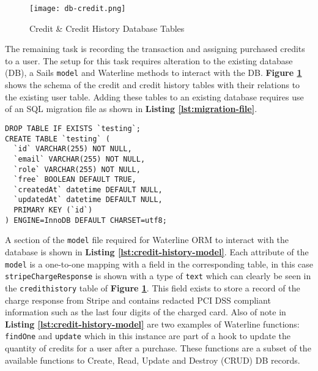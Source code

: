 \begin{figure}[!hbt]
  	\centering
 	\texttt{[image: db-credit.png]}
  	\caption{Credit \& Credit History Database Tables}
 	\label{fig:db-credit}
\end{figure}

The remaining task is recording the transaction and assigning purchased credits to a user. The setup for this task requires alteration to the existing database (DB), a Sails \texttt{model} and Waterline methods to interact with the DB. \textbf{Figure \ref{fig:db-credit}} shows the schema of the credit and credit history tables with their relations to the existing user table. Adding these tables to an existing database requires use of an SQL migration file as shown in \textbf{Listing \ref{lst:migration-file}}.\\

\hspace{0.1\textwidth}
\begin{minipage}{.72\textwidth}
\begin{listing}[H]
\begin{verbatim}
DROP TABLE IF EXISTS `testing`;
CREATE TABLE `testing` (
  `id` VARCHAR(255) NOT NULL,
  `email` VARCHAR(255) NOT NULL,
  `role` VARCHAR(255) NOT NULL,
  `free` BOOLEAN DEFAULT TRUE,
  `createdAt` datetime DEFAULT NULL,
  `updatedAt` datetime DEFAULT NULL,
  PRIMARY KEY (`id`)
) ENGINE=InnoDB DEFAULT CHARSET=utf8;

\end{verbatim}
\label{lst:migration-file}
\end{listing}
\end{minipage}
\hspace{0.1\textwidth}
\vspace{0.3cm}

A section of the \texttt{model} file required for Waterline ORM to interact with the database is shown in \textbf{Listing \ref{lst:credit-history-model}}. Each attribute of the \texttt{model} is a one-to-one mapping with a field in the corresponding table, in this case \texttt{stripeChargeResponse} is shown with a type of \texttt{text} which can clearly be seen in the \texttt{credithistory} table of \textbf{Figure \ref{fig:db-credit}}. This field exists to store a record of the charge response from Stripe and contains redacted PCI DSS compliant information such as the last four digits of the charged card. Also of note in \textbf{Listing \ref{lst:credit-history-model}} are two examples of Waterline functions: \texttt{findOne} and \texttt{update} which in this instance are part of a hook to update the quantity of credits for a user after a purchase. These functions are a subset of the available functions to Create, Read, Update and Destroy (CRUD) DB records.

